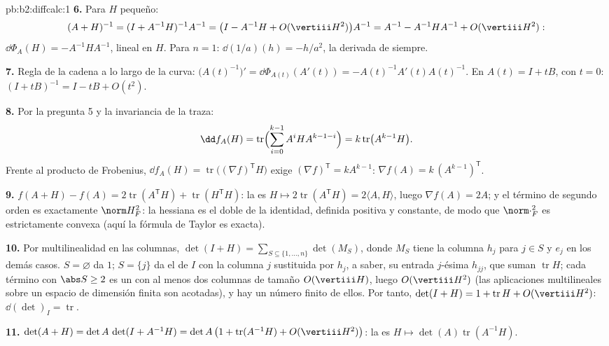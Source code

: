 \begin{solution}{pb:b2:diffcalc:1}
\textbf{6.} Para $H$ pequeño:
\[
(A+H)^{-1} = (I + A^{-1}H)^{-1}A^{-1}
= \bigl(I - A^{-1}H + O(\vertiii H^2)\bigr)A^{-1}
= A^{-1} - A^{-1}HA^{-1} + O(\vertiii H^2) :
\]
$\dd\Phi_A(H) = -A^{-1}HA^{-1}$, lineal en $H$. Para $n = 1$:
$\dd(1/a)(h) = -h/a^2$, la derivada de siempre.

\textbf{7.} Regla de la cadena a lo largo de la curva:
$\bigl(A(t)^{-1}\bigr)' = \dd\Phi_{A(t)}(A'(t)) =
-A(t)^{-1}A'(t)A(t)^{-1}$. En $A(t) = I + tB$, con $t = 0$: $(I +
tB)^{-1} = I - tB + O(t^2)$.

\textbf{8.} Por la pregunta 5 y la invariancia  de la traza:
\[
\dd f_A(H) = \operatorname{tr}\Bigl(\sum_{i=0}^{k-1}
A^iHA^{k-1-i}\Bigr) = k\operatorname{tr}\bigl(A^{k-1}H\bigr) .
\]
Frente al producto de Frobenius, $\dd f_A(H) =
\operatorname{tr}\bigl((\nabla f)^{\mathsf T}H\bigr)$ exige $(\nabla
f)^{\mathsf T} = kA^{k-1}$: $\nabla f(A) = k\,(A^{k-1})^{\mathsf T}$.

\textbf{9.} $f(A + H) - f(A) = 2\operatorname{tr} (A^{\mathsf T}H) +
\operatorname{tr}(H^{\mathsf T}H)$: la  es $H \mapsto
2\operatorname{tr}(A^{\mathsf T}H) = 2\langle A, H\rangle$, luego
$\nabla f(A) = 2A$; y el término de segundo orden es exactamente
$\norm H_F^2$: la hessiana es el doble de la 
identidad, definida positiva y constante, de modo que
$\norm\cdot_F^2$ es estrictamente convexa (aquí la fórmula de Taylor
es exacta).

\textbf{10.} Por multilinealidad en las columnas, $\det(I + H) =
\sum_{S\subseteq\{1,\dots,n\}}\det(M_S)$, donde $M_S$ tiene la
columna $h_j$ para $j \in S$ y $e_j$ en los demás casos. $S =
\varnothing$ da $1$; $S = \{j\}$ da el  de $I$ con la
columna $j$ sustituida por $h_j$, a saber, su entrada $j$-ésima
$h_{jj}$, que suman $\operatorname{tr}H$; cada término con $\abs S
\geq 2$ es un  con al menos dos columnas de tamaño
$O(\vertiii H)$, luego $O(\vertiii H^2)$ (las aplicaciones
multilineales sobre un espacio de dimensión finita son acotadas), y
hay un número finito de ellos. Por tanto, $\det(I + H) = 1 +
\operatorname{tr}H + O(\vertiii H^2)$: $\dd(\det)_I =
\operatorname{tr}$.

\textbf{11.} $\det(A + H) = \det A\,\det(I + A^{-1}H) = \det
A\,\bigl(1 + \operatorname{tr}(A^{-1}H) + O(\vertiii H^2)\bigr)$: la
 es $H \mapsto \det(A)\operatorname{tr}(A^{-1}H)$.


\end{solution}
